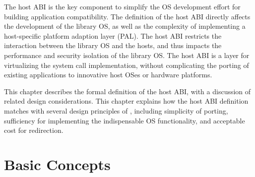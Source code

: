 The host ABI is the key component
to simplify the OS development effort for building application compatibility.
The definition of the host ABI directly affects the development of the library OS, as well as  the complexity of implementing a host-specific platform adaption layer (PAL).
The host ABI restricts the interaction between the library OS and the hosts, and thus impacts the performance and security isolation of the library OS.
The host ABI is a layer for virtualizing the system call implementation,
without complicating the porting of existing applications to innovative host OSes or hardware platforms.




This chapter describes the formal definition of the host ABI, with a discussion of related design considerations.
This chapter explains how the host ABI definition matches with
several design principles of \graphene{},
including simplicity of porting, sufficiency for implementing the indispensable OS functionality,
and acceptable cost for redirection.




\section{Basic Concepts}


